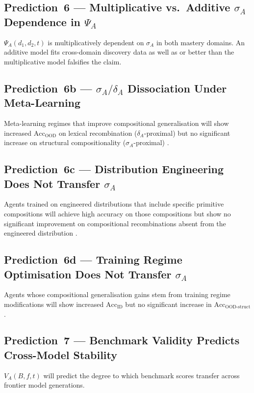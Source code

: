 \documentclass[11pt,a4paper]{article}
\begin{document}
\subsection{Prediction~6 --- Multiplicative vs.\ Additive \texorpdfstring{$\sigma_A$}{sigma\_A}
Dependence in \texorpdfstring{$\Psi_A$}{Psi\_A}}
$\Psi_A(d_1,d_2,t)$ is multiplicatively dependent on $\sigma_A$ in both
mastery domains. An additive model fits cross-domain discovery data as
well as or better than the multiplicative model falsifies the claim.

\subsection{Prediction~6b --- \texorpdfstring{$\sigma_A/\delta_A$}{sigma\_A/delta\_A} Dissociation Under
Meta-Learning}
Meta-learning regimes that improve compositional generalisation will
show increased $\text{Acc}_{\text{OOD}}$ on lexical recombination
($\delta_A$-proximal) but no significant increase on structural
compositionality ($\sigma_A$-proximal)
\citep{lake2023humanlikesystematicgeneralization}.

\subsection{Prediction~6c --- Distribution Engineering Does Not Transfer
\texorpdfstring{$\sigma_A$}{sigma\_A}}
Agents trained on engineered distributions that include specific
primitive compositions will achieve high accuracy on those compositions
but show no significant improvement on compositional recombinations
absent from the engineered distribution
\citep{patel2022revisitingcompositionalgeneralization}.

\subsection{Prediction~6d --- Training Regime Optimisation Does Not
Transfer \texorpdfstring{$\sigma_A$}{sigma\_A}}
Agents whose compositional generalisation gains stem from training regime
modifications will show increased $\text{Acc}_{\text{ID}}$ but no
significant increase in $\text{Acc}_{\text{OOD-struct}}$.

\subsection{Prediction~7 --- Benchmark Validity Predicts Cross-Model
Stability}
$V_A(B,f,t)$ will predict the degree to which benchmark scores transfer
across frontier model generations.
\end{document}
